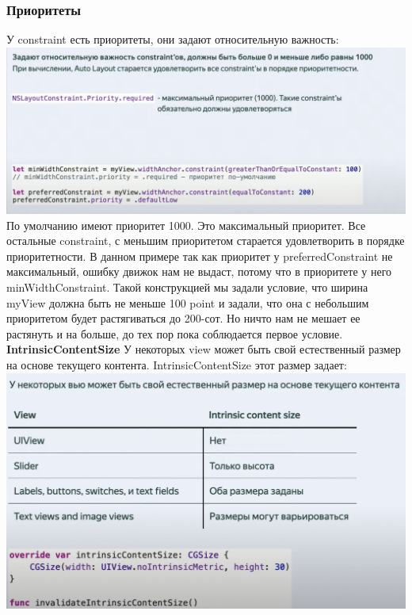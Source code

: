 \documentclass{article}
\begin{document}
    \subsubsection{Приоритеты}
    У constraint есть приоритеты, они задают относительную важность:
    \newline
    \includegraphics[scale = 0.5]{pic/Снимок экрана 2023-07-31 в 22.15.55.png}
    \newline
    По умолчанию имеют приоритет 1000. Это максимальный приоритет. Все остальные constraint, с меньшим приоритетом старается удовлетворить в порядке приоритетности. 
    \newline
    В данном примере так как приоритет у preferredConstraint не максимальный, ошибку движок нам не выдаст, потому что в приоритете у него minWidthConstraint.
    \newline
    Такой конструкцией мы задали условие, что ширина myView должна быть не меньше 100 point и задали, что она с небольшим приоритетом будет растягиваться до 200-сот. Но ничто нам не мешает ее растянуть и на больше, до тех пор пока соблюдается первое условие. 
    \newline
    \textbf{IntrinsicContentSize}
    У некоторых view может быть свой естественный размер на основе текущего контента. IntrinsicContentSize этот размер задает:
    \newline
    \includegraphics[scale = 0.3]{pic/Снимок экрана 2023-07-31 в 22.22.04.png}
\end{document}
